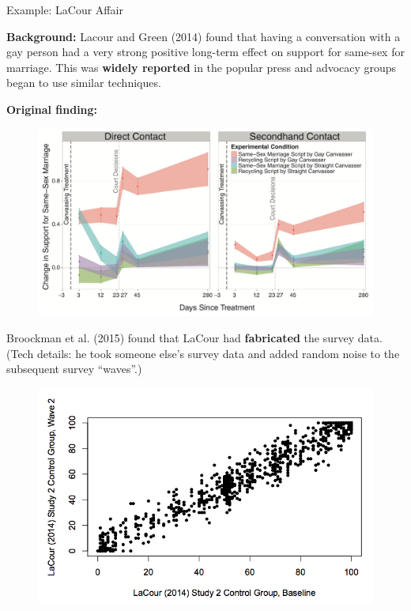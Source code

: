 \documentclass[10pt]{beamer}
\begin{document}
\begin{frame}{Example: LaCour Affair}

    \textbf{Background:} Lacour and Green (2014) found that having a conversation with a gay person had a very strong positive long-term effect on support for same-sex for marriage. This was \textbf{widely reported} in the popular press and advocacy groups began to use similar techniques. 

    \textbf{Original finding:}

    \begin{figure}
        \includegraphics[scale=0.23]{img/lacour_original.png}
    \end{figure}

\end{frame}

\begin{frame}

     Broockman et al. (2015) found that LaCour had \textbf{fabricated} the survey data. (Tech details: he took someone else's survey data and added random noise to the subsequent survey ``waves''.)

     \begin{figure}
         \includegraphics[scale=0.3]{img/lacour_noise.png}
     \end{figure}

\end{frame}
\end{document}

